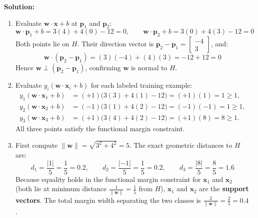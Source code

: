 \documentclass[11pt, letterpaper]{article}
\theoremstyle{definition}
\theoremstyle{remark}
\begin{document}
\textbf{Solution:}
\begin{enumerate}[label=(\alph*)]
    \item Evaluate $\mathbf{w} \cdot \mathbf{x} + b$ at $\mathbf{p}_1$ and $\mathbf{p}_2$:
    \[
    \mathbf{w} \cdot \mathbf{p}_1 + b = 3(4) + 4(0) - 12 = 0, \qquad \mathbf{w} \cdot \mathbf{p}_2 + b = 3(0) + 4(3) - 12 = 0
    \]
    Both points lie on $H$. Their direction vector is $\mathbf{p}_2 - \mathbf{p}_1 = \begin{bmatrix} -4 \\ 3 \end{bmatrix}$, and:
    \[
    \mathbf{w} \cdot (\mathbf{p}_2 - \mathbf{p}_1) = (3)(-4) + (4)(3) = -12 + 12 = 0
    \]
    Hence $\mathbf{w} \perp (\mathbf{p}_2 - \mathbf{p}_1)$, confirming $\mathbf{w}$ is normal to $H$.
    \item Evaluate $y_i(\mathbf{w} \cdot \mathbf{x}_i + b)$ for each labeled training example:
    \begin{align*}
    y_1(\mathbf{w} \cdot \mathbf{x}_1 + b) &= (+1)\big(3(3) + 4(1) - 12\big) = (+1)(1) = 1 \ge 1, \\
    y_2(\mathbf{w} \cdot \mathbf{x}_2 + b) &= (-1)\big(3(1) + 4(2) - 12\big) = (-1)(-1) = 1 \ge 1, \\
    y_3(\mathbf{w} \cdot \mathbf{x}_3 + b) &= (+1)\big(3(4) + 4(2) - 12\big) = (+1)(8) = 8 \ge 1.
    \end{align*}
    All three points satisfy the functional margin constraint.
    \item First compute $\|\mathbf{w}\| = \sqrt{3^2 + 4^2} = 5$. The exact geometric distances to $H$ are:
    \[
    d_1 = \frac{|1|}{5} = \frac{1}{5} = 0.2, \qquad d_2 = \frac{|-1|}{5} = \frac{1}{5} = 0.2, \qquad d_3 = \frac{|8|}{5} = \frac{8}{5} = 1.6
    \]
    Because equality holds in the functional margin constraint for $\mathbf{x}_1$ and $\mathbf{x}_2$ (both lie at minimum distance $\frac{1}{\|\mathbf{w}\|} = \frac{1}{5}$ from $H$), $\mathbf{x}_1$ and $\mathbf{x}_2$ are the \textbf{support vectors}. The total margin width separating the two classes is $\frac{2}{\|\mathbf{w}\|} = \frac{2}{5} = 0.4$.
\end{enumerate}
\end{document}
